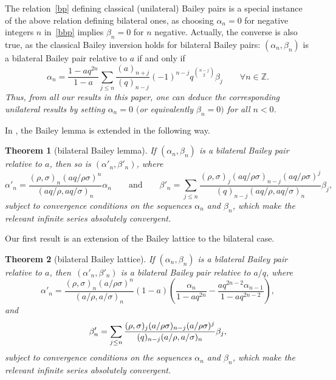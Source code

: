 \documentclass[11pt]{article}
\numberwithin{equation}{section}
\newtheorem{Theorem}{Theorem}[section]
\begin{document}
\begin{Remark}\label{rk:bilatinversion}
The relation~\eqref{bp} defining classical (unilateral) Bailey pairs is a special instance of the above relation defining bilateral ones, as choosing $\alpha_n=0$ for negative integers $n$ in~\eqref{bbp} implies $\beta_n=0$ for $n$ negative. Actually, the converse is also true, as the classical Bailey inversion holds for bilateral Bailey pairs: $(\alpha_n, \beta_n)$ is a bilateral Bailey pair relative to $a$ if and only if
\begin{equation}\label{bilatinversion}
\alpha_n=\frac{1-aq^{2n}}{1-a}\sum_{j\leq n}\frac{(a)_{n+j}}{(q)_{n-j}}(-1)^{n-j}q^{\binom{n-j}{2}}\beta_j\qquad\forall n\in\mathbb{Z}.
\end{equation}
\textit{Thus, from all our results in this paper, one can deduce the corresponding unilateral results by setting $\alpha_n=0$ $($or equivalently $\beta_n=0)$ for all $n<0$.}
\end{Remark}

In \cite{BMS}, the Bailey lemma is extended in the following way.
\begin{Theorem}[bilateral Bailey lemma]\label{thm:bilatbaileylemma}
If $(\alpha_n, \beta_n)$ is a bilateral Bailey pair relative to $a$, then
so is $(\alpha'_n, \beta'_n)$, where
\begin{equation*}\alpha'_n=\frac{(\rho,\sigma)_n(aq/\rho\sigma)^n}{
(aq/\rho,aq/\sigma)_n}\alpha_n\qquad\mbox{and}\qquad\beta'_n=\sum_{j\leq n}\frac{(\rho,\sigma)_j(aq/\rho\sigma)_{n-j}(aq/\rho\sigma)^j}{(q)_{n-j}(aq/\rho,aq/\sigma)_n}\beta_j,
\end{equation*}
subject to convergence conditions on the sequences $\alpha_n$ and $\beta_n$, which make the relevant infinite series absolutely convergent.
\end{Theorem}

Our first result is an extension of the Bailey lattice to the bilateral case.

\begin{Theorem}[bilateral Bailey lattice]\label{thm:bilatbaileylattice}
If $(\alpha_n, \beta_n)$ is a bilateral Bailey pair relative to $a$, then~$(\alpha'_n, \beta'_n)$ is a bilateral Bailey pair relative to $a/q$, where
\begin{equation*}\alpha'_n=\frac{(\rho,\sigma)_n(a/\rho\sigma)^n}{(a/\rho,a/\sigma)_n}(1-a)\left(\frac{\alpha_n}{1-aq^{2n}}-\frac{aq^{2n-2}\alpha_{n-1}}{1-aq^{2n-2}}\right),
\end{equation*}
and
\begin{equation*}\beta'_n=\sum_{j\leq n}{(\rho,\sigma)_j(a/\rho\sigma)_{n-j}(a/\rho\sigma)^j\over (q)_{n-j}(a/\rho,a/\sigma)_n} \beta_j,
\end{equation*}
subject to convergence conditions on the sequences $\alpha_n$ and $\beta_n$, which make the relevant infinite series absolutely convergent.
\end{Theorem}
\end{document}
